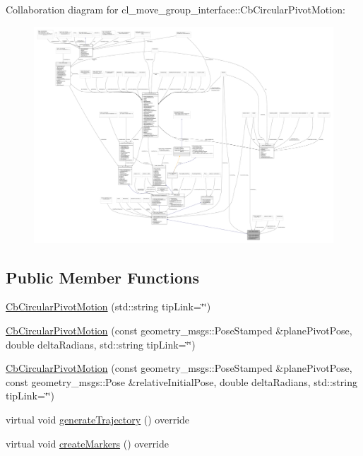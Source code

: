 Collaboration diagram for cl\+\_\+move\+\_\+group\+\_\+interface\+:\+:Cb\+Circular\+Pivot\+Motion\+:
\nopagebreak
\begin{figure}[H]
\begin{center}
\leavevmode
\includegraphics[width=350pt]{classcl__move__group__interface_1_1CbCircularPivotMotion__coll__graph}
\end{center}
\end{figure}
\subsection*{Public Member Functions}
\begin{DoxyCompactItemize}
\item 
\hyperlink{classcl__move__group__interface_1_1CbCircularPivotMotion_adc0d93cb33df529d6a1e277fed25ceb1}{Cb\+Circular\+Pivot\+Motion} (std\+::string tip\+Link=\char`\"{}\char`\"{})
\item 
\hyperlink{classcl__move__group__interface_1_1CbCircularPivotMotion_adff54e8098cab08fdf52839cd1e40dcb}{Cb\+Circular\+Pivot\+Motion} (const geometry\+\_\+msgs\+::\+Pose\+Stamped \&plane\+Pivot\+Pose, double delta\+Radians, std\+::string tip\+Link=\char`\"{}\char`\"{})
\item 
\hyperlink{classcl__move__group__interface_1_1CbCircularPivotMotion_ae2035c601c6eb32950dc1aba2aff5f3a}{Cb\+Circular\+Pivot\+Motion} (const geometry\+\_\+msgs\+::\+Pose\+Stamped \&plane\+Pivot\+Pose, const geometry\+\_\+msgs\+::\+Pose \&relative\+Initial\+Pose, double delta\+Radians, std\+::string tip\+Link=\char`\"{}\char`\"{})
\item 
virtual void \hyperlink{classcl__move__group__interface_1_1CbCircularPivotMotion_a8d019ec6b9b26a2af0740b915d441a40}{generate\+Trajectory} () override
\item 
virtual void \hyperlink{classcl__move__group__interface_1_1CbCircularPivotMotion_a48911ad62608cb00c04e979e2f6f644a}{create\+Markers} () override
\end{DoxyCompactItemize}
